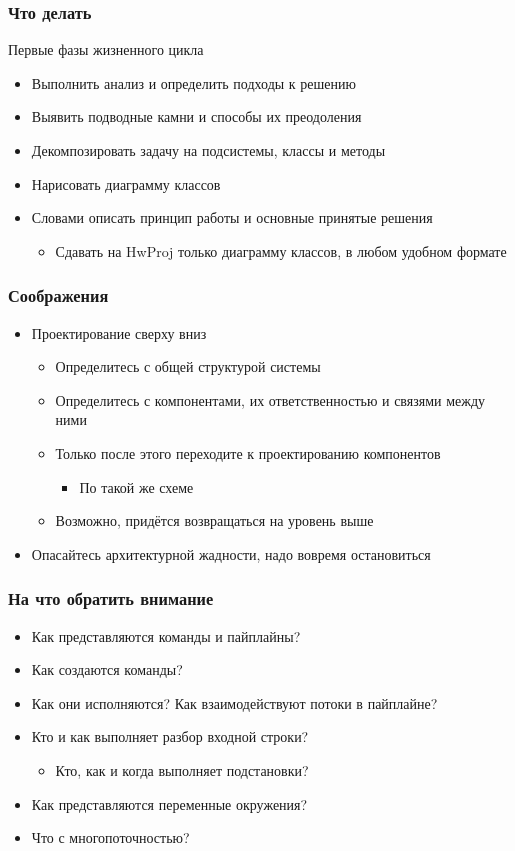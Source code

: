 \documentclass[xetex,mathserif,serif]{beamer}
\begin{document}
	\begin{frame}
		\frametitle{Что делать}
		Первые фазы жизненного цикла
		\begin{itemize}
			\item Выполнить анализ и определить подходы к решению
			\item Выявить подводные камни и способы их преодоления
			\item Декомпозировать задачу на подсистемы, классы и методы
			\item Нарисовать диаграмму классов
			\item Словами описать принцип работы и основные принятые решения
			\begin{itemize}
				\item Сдавать на HwProj только диаграмму классов, в любом удобном формате
			\end{itemize}
		\end{itemize}
	\end{frame}

		\begin{frame}
		\frametitle{Соображения}
		\begin{itemize}
			\item Проектирование сверху вниз
			\begin{itemize}
				\item Определитесь с общей структурой системы
				\item Определитесь с компонентами, их ответственностью и связями между ними
				\item Только после этого переходите к проектированию компонентов
				\begin{itemize}
					\item По такой же схеме
				\end{itemize}
				\item Возможно, придётся возвращаться на уровень выше
			\end{itemize}
			\item Опасайтесь архитектурной жадности, надо вовремя остановиться
		\end{itemize}
	\end{frame}

	\begin{frame}
		\frametitle{На что обратить внимание}
		\begin{itemize}
			\item Как представляются команды и пайплайны?
			\item Как создаются команды?
			\item Как они исполняются? Как взаимодействуют потоки в пайплайне?
			\item Кто и как выполняет разбор входной строки?
			\begin{itemize}
				\item Кто, как и когда выполняет подстановки?
			\end{itemize}
			\item Как представляются переменные окружения?
			\item Что с многопоточностью?
		\end{itemize}
	\end{frame}
\end{document}
